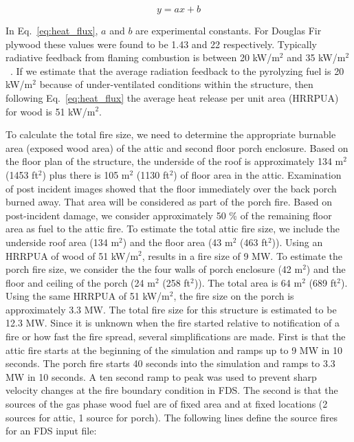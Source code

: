 \documentclass[11pt,oneside]{book}
\begin{document}
\begin{equation}
y = ax+b
\label{eq:heat_flux}
\end{equation}

In Eq.~\ref{eq:heat_flux}, $a$ and $b$ are experimental constants. For Douglas Fir plywood these values were found to be 1.43 and 22 respectively. Typically radiative feedback from flaming combustion is between 20 kW/m$^2$ and 35 kW/m$^2$~\cite{tsaidrysdale}. If we estimate that the average radiation feedback to the pyrolyzing fuel is 20 kW/m$^2$ because of under-ventilated conditions within the structure, then following Eq.~\ref{eq:heat_flux} the average heat release per unit area (HRRPUA) for wood is 51 kW/m$^2$.

To calculate the total fire size, we need to determine the appropriate burnable area (exposed wood area) of the attic and second floor porch enclosure. Based on the floor plan of the structure, the underside of the roof is approximately 134 m$^2$ (1453 ft$^2$) plus there is 105 m$^2$ (1130 ft$^2$) of floor area in the attic. Examination of post incident images showed that the floor immediately over the back porch burned away. That area will be considered as part of the porch fire. Based on post-incident damage, we consider approximately 50 \% of the remaining floor area as fuel to the attic fire. To estimate the total attic fire size, we include the underside roof area (134 m$^2$) and the floor area (43 m$^2$ (463 ft$^2$)). Using an HRRPUA of wood of 51 kW/m$^2$, results in a fire size of 9 MW. To estimate the porch fire size, we consider the the four walls of porch enclosure (42 m$^2$) and the floor and ceiling of the porch (24 m$^2$ (258 ft$^2$)). The total area is 64 m$^2$ (689 ft$^2$). Using the same HRRPUA of 51 kW/m$^2$, the fire size on the porch is approximately 3.3 MW. The total fire size for this structure is estimated to be 12.3 MW. Since it is unknown when the fire started relative to notification of a fire or how fast the fire spread, several simplifications are made. First is that the attic fire starts at the beginning of the simulation and ramps up to 9 MW in 10 seconds. The porch fire starts 40 seconds into the simulation and ramps to 3.3 MW in 10 seconds. A ten second ramp to peak was used to prevent sharp velocity changes at the fire boundary condition in FDS. The second is that the sources of the gas phase wood fuel are of fixed area and at fixed locations (2 sources for attic, 1 source for porch). The following lines define the source fires for an FDS input file:
\end{document}
